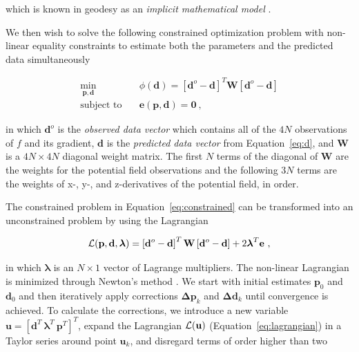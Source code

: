\noindent
which is known in geodesy as an \textit{implicit mathematical model}
\citep{Vanicek1986}.

We then wish to solve the following constrained optimization problem with
non-linear equality constraints to estimate both the parameters and the
predicted data simultaneously

\begin{equation}
  \begin{aligned}
    \min_{\mathbf{p}, \mathbf{d}} \quad &
      \phi(\mathbf{d}) =
      \left[\mathbf{d}^o - \mathbf{d}\right]^T \mathbf{W}
      \left[\mathbf{d}^o - \mathbf{d}\right]
    \\
    \textrm{subject to} \quad &
      \mathbf{e}(\mathbf{p}, \mathbf{d}) = \mathbf{0}
    \ ,
  \end{aligned}
  \label{eq:constrained}
\end{equation}

\noindent
in which $\mathbf{d}^o$ is the \textit{observed data vector} which contains all
of the $4N$ observations of $f$ and its gradient,
$\mathbf{d}$ is the \textit{predicted data vector} from Equation~\ref{eq:d},
and $\mathbf{W}$ is a $4N \times 4N$ diagonal weight matrix.
The first $N$ terms of the diagonal of $\mathbf{W}$ are the weights for the
potential field observations and the following $3N$ terms are the weights of
x-, y-, and z-derivatives of the potential field, in order.

The constrained problem in Equation~\ref{eq:constrained} can be transformed
into an unconstrained problem by using the Lagrangian

\begin{equation}
  \operatorname{\mathcal{L}}(\mathbf{p}, \mathbf{d}, \boldsymbol{\lambda}) =
    \left[\mathbf{d}^o - \mathbf{d}\right]^T \mathbf{W}
    \left[\mathbf{d}^o - \mathbf{d}\right]
    +
    2 \boldsymbol{\lambda}^T \mathbf{e}
  \ ,
  \label{eq:lagrangian}
\end{equation}

\noindent
in which $\boldsymbol{\lambda}$ is an $N \times 1$ vector of Lagrange
multipliers.
The non-linear Lagrangian is minimized through Newton's method
\citep{Aster2018}.
We start with initial estimates $\mathbf{p}_0$ and $\mathbf{d}_0$ and then
iteratively apply corrections $\mathbf{\Delta p}_k$ and $\mathbf{\Delta d}_k$
until convergence is achieved.
To calculate the corrections, we introduce a new variable $\mathbf{u} =
[\mathbf{d}^T\  \boldsymbol{\lambda}^T \ \mathbf{p}^T]^T$, expand the
Lagrangian $\operatorname{\mathcal{L}}(\mathbf{u})$ (Equation~\ref{eq:lagrangian}) in a Taylor
series around point $\mathbf{u}_k$, and disregard terms of order higher than
two

